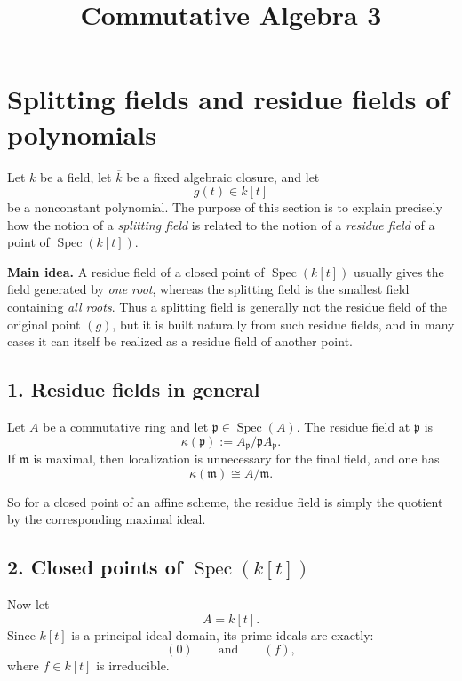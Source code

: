 \documentclass[12pt,a4paper]{article}
\title{Commutative Algebra 3}
\author{}
\date{}
\theoremstyle{plain}
\theoremstyle{definition}      %
\begin{document}
	\maketitle
	
	
\section*{Splitting fields and residue fields of polynomials}

Let \(k\) be a field, let \(\overline{k}\) be a fixed algebraic closure, and let
\[
g(t)\in k[t]
\]
be a nonconstant polynomial. The purpose of this section is to explain precisely how the notion of a \emph{splitting field} is related to the notion of a \emph{residue field} of a point of \(\operatorname{Spec}(k[t])\).

\bigskip

\textbf{Main idea.}
A residue field of a closed point of \(\operatorname{Spec}(k[t])\) usually gives the field generated by \emph{one root}, whereas the splitting field is the smallest field containing \emph{all roots}. Thus a splitting field is generally not the residue field of the original point \((g)\), but it is built naturally from such residue fields, and in many cases it can itself be realized as a residue field of another point.

\subsection*{1. Residue fields in general}

Let \(A\) be a commutative ring and let \(\mathfrak p\in \operatorname{Spec}(A)\). The residue field at \(\mathfrak p\) is
\[
\kappa(\mathfrak p):=A_{\mathfrak p}/\mathfrak p A_{\mathfrak p}.
\]
If \(\mathfrak m\) is maximal, then localization is unnecessary for the final field, and one has
\[
\kappa(\mathfrak m)\cong A/\mathfrak m.
\]

So for a closed point of an affine scheme, the residue field is simply the quotient by the corresponding maximal ideal.

\subsection*{2. Closed points of \(\operatorname{Spec}(k[t])\)}

Now let
\[
A=k[t].
\]
Since \(k[t]\) is a principal ideal domain, its prime ideals are exactly:
\[
(0)\qquad\text{and}\qquad (f),
\]
where \(f\in k[t]\) is irreducible.
\end{document}
